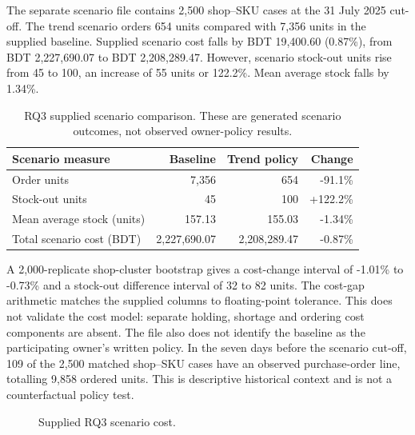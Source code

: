 The separate scenario file contains 2,500 shop--SKU cases at the 31 July 2025 cut-off. The trend scenario orders 654 units compared with 7,356 units in the supplied baseline. Supplied scenario cost falls by BDT 19,400.60 (0.87\%), from BDT 2,227,690.07 to BDT 2,208,289.47. However, scenario stock-out units rise from 45 to 100, an increase of 55 units or 122.2\%. Mean average stock falls by 1.34\%.

\begin{table}[htbp]
\centering
\small
\begin{tabular}{lrrr}
\toprule
\textbf{Scenario measure} & \textbf{Baseline} & \textbf{Trend policy} & \textbf{Change}\\
\midrule
Order units & 7,356 & 654 & -91.1\%\\
Stock-out units & 45 & 100 & +122.2\%\\
Mean average stock (units) & 157.13 & 155.03 & -1.34\%\\
Total scenario cost (BDT) & 2,227,690.07 & 2,208,289.47 & -0.87\%\\
\bottomrule
\end{tabular}
\caption{RQ3 supplied scenario comparison. These are generated scenario outcomes, not observed owner-policy results.}
\label{tab:rq3_scenario}
\end{table}

A 2,000-replicate shop-cluster bootstrap gives a cost-change interval of -1.01\% to -0.73\% and a stock-out difference interval of 32 to 82 units. The cost-gap arithmetic matches the supplied columns to floating-point tolerance. This does not validate the cost model: separate holding, shortage and ordering cost components are absent. The file also does not identify the baseline as the participating owner's written policy. In the seven days before the scenario cut-off, 109 of the 2,500 matched shop--SKU cases have an observed purchase-order line, totalling 9,858 ordered units. This is descriptive historical context and is not a counterfactual policy test.

\begin{figure}[htbp]
\centering
{}
\caption{Supplied RQ3 scenario cost.}
\label{fig:rq3_cost}
\end{figure}

